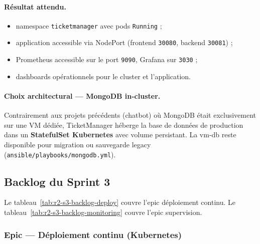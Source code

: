 \paragraph{Résultat attendu.}
\begin{itemize}
  \item namespace \texttt{ticketmanager} avec pods \texttt{Running} ;
  \item application accessible via NodePort (frontend \texttt{30080}, backend \texttt{30081}) ;
  \item Prometheus accessible sur le port \texttt{9090}, Grafana sur \texttt{3030} ;
  \item dashboards opérationnels pour le cluster et l'application.
\end{itemize}

\paragraph{Choix architectural — MongoDB in-cluster.}
Contrairement aux projets précédents (chatbot) où MongoDB était exclusivement sur une VM
dédiée, TicketManager héberge la base de données de production dans un
\textbf{StatefulSet Kubernetes} avec volume persistant. La vm-db reste disponible pour
migration ou sauvegarde legacy (\texttt{ansible/playbooks/mongodb.yml}).


\subsection{Backlog du Sprint 3}

Le tableau~\ref{tab:r2-s3-backlog-deploy} couvre l'epic déploiement continu. Le
tableau~\ref{tab:r2-s3-backlog-monitoring} couvre l'epic supervision.

\subsubsection{Epic — Déploiement continu (Kubernetes)}

